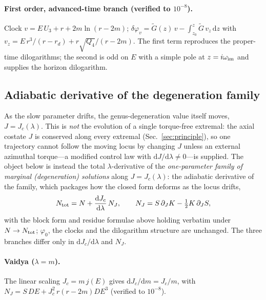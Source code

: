 \documentclass[12pt]{iopart}
\newcommand{\Jc}{J_{c}}
\newcommand{\dd}{\mathrm{d}}
\begin{document}
\paragraph{First order, advanced-time branch (verified to $10^{-8}$).}
Clock $v=E\,U_3+r+2m\ln(r-2m)$;
$\delta\varphi_v=\tilde G(z)\,v-\int_{z_0}^z\tilde G\,v_z\,\dd z$ with
$v_z=E\,r^3/(r-r_d)+r\sqrt{Q_4}/(r-2m)$. The first term reproduces the proper-time
dilogarithms; the second is odd on $E$ with a simple pole at $z=i\omega_{\rm im}$ and
supplies the horizon dilogarithm.

\subsection{Adiabatic derivative of the degeneration family}
\label{app:tracking}
As the slow parameter drifts, the genus-degeneration value itself moves,
$J=\Jc(\lambda)$. This is \emph{not} the evolution of a single torque-free extremal:
the axial costate $J$ is conserved along every extremal
(Sec.~\ref{sec:principle}), so one trajectory cannot follow the moving locus by
changing $J$ unless an external azimuthal torque---a modified control law with
$\dd J/\dd\lambda\neq0$---is supplied. The object below is instead the total
$\lambda$-derivative of the \emph{one-parameter family of marginal (degeneration)
solutions} along $J=\Jc(\lambda)$: the adiabatic derivative of the family, which
packages how the closed form deforms as the locus drifts,
\begin{equation}
N_{\rm tot}=N+\frac{\dd\Jc}{\dd\lambda}\,N_J,\qquad
N_J=S\,\partial_JK-\tfrac12K\,\partial_JS,
\label{eq:Ntot-track}
\end{equation}
with the block form and residue formulae above holding verbatim under $N\to N_{\rm tot}$;
$\varphi_0$, the clocks and the dilogarithm structure are unchanged. The three branches
differ only in $\dd\Jc/\dd\lambda$ and $N_J$.

\paragraph{Vaidya ($\lambda=m$).}
The linear scaling $\Jc=m\,j(E)$ gives $\dd\Jc/\dd m=\Jc/m$, with
$N_J=S\,DE+\Jc^2\,r(r-2m)DE^3$ (verified to $10^{-8}$).
\end{document}
